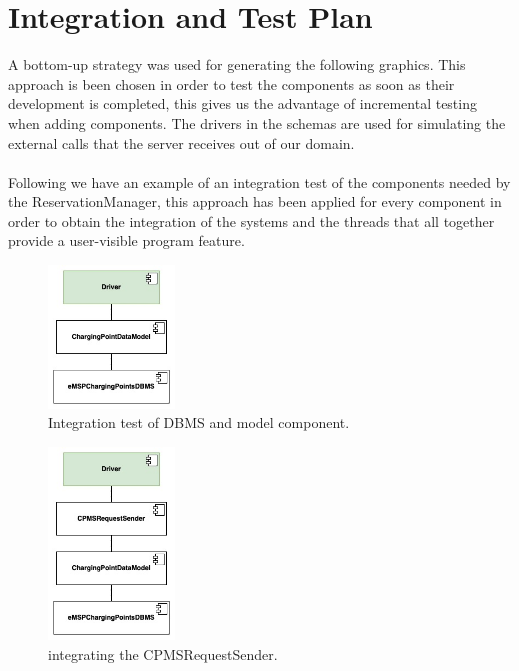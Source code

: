 \documentclass{Configuration_Files/PoliMi3i_thesis}
\begin{document}
\section{Integration and Test Plan}

A bottom-up strategy was used for generating the following graphics. This approach is been chosen in order to test the components as soon as their development is completed, this gives us the advantage of incremental testing when adding components. The drivers in the schemas are used for simulating the external calls that the server receives out of our domain.\\\\
Following we have an example of an integration test of the components needed by the ReservationManager, this approach has been applied for every component in order to obtain the integration of the systems and the threads that all together provide a user-visible program feature.

\begin{figure}[H]
    \centering
    \includegraphics[width=0.3\textwidth]{Images/test/Thread example/2.jpg}
    \caption{Integration test of DBMS and model component.}
\end{figure}

\begin{figure}[H]
    \centering
    \includegraphics[width=0.3\textwidth]{Images/test/Thread example/3.jpg}
    \caption{integrating the CPMSRequestSender.}
\end{figure}
\end{document}
